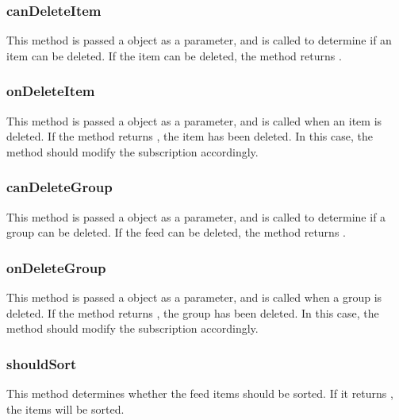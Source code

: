 \documentclass[letterpaper,12pt,english,openany,oneside]{sphinxmanual}
\begin{document}
\subsubsection{canDeleteItem}
\label{\detokenize{Tracker_InboxAPI:candeleteitem}}
This method is passed a  object as a parameter, and is called to determine if an item can be deleted. If the item can be deleted, the method returns .




\subsubsection{onDeleteItem}
\label{\detokenize{Tracker_InboxAPI:ondeleteitem}}
This method is passed a  object as a parameter, and is called when an item is deleted. If the method returns , the item has been deleted. In this case, the method should modify the subscription accordingly.




\subsubsection{canDeleteGroup}
\label{\detokenize{Tracker_InboxAPI:candeletegroup}}
This method is passed a  object as a parameter, and is called to determine if a group can be deleted. If the feed can be deleted, the method returns .




\subsubsection{onDeleteGroup}
\label{\detokenize{Tracker_InboxAPI:ondeletegroup}}
This method is passed a  object as a parameter, and is called when a group is deleted. If the method returns , the group has been deleted. In this case, the method should modify the subscription accordingly.




\subsubsection{shouldSort}
\label{\detokenize{Tracker_InboxAPI:shouldsort}}
This method determines whether the feed items should be sorted. If it returns , the items will be sorted.
\end{document}
